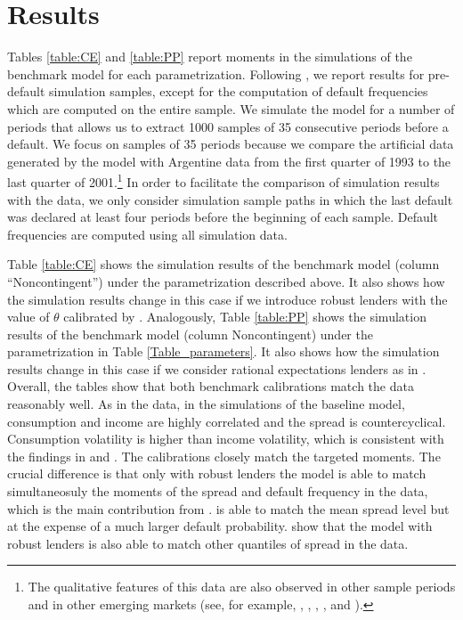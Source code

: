 \section{Results \label{sec:quantresults}}

Tables \ref{table:CE} and \ref{table:PP} report moments in the simulations of the benchmark model for each parametrization.  Following \cite{PouzoPresno2016}, we report results for pre-default simulation samples, except for the computation of default frequencies which are computed on the entire sample. We simulate the model for a number of periods that allows us to extract 1000 samples of 35 consecutive periods before a default. We focus on samples of 35 periods because we compare the artificial data generated by the model with Argentine data from the first quarter of 1993 to the last quarter of 2001.\footnote{The qualitative features of this data are also observed in other sample periods and in other emerging markets (see, for example, \citealp{AG_cycles}, \citealp{Alvarez}, \citealp{Bora}, \citealp{Neumeyer05}, and \citealp{drives}).} In order to facilitate the comparison of simulation results with the data, we only consider simulation sample paths in which the last default was declared at least four periods before the beginning
of each sample. Default frequencies are computed using all simulation data.

Table \ref{table:CE} shows the simulation results of the benchmark model (column ``Noncontingent'') under the \cite{Chatty} parametrization described above. It also shows how the simulation results change in this case if we introduce robust lenders with the value of $\theta$ calibrated by \cite{PouzoPresno2016}. Analogously, Table \ref{table:PP} shows the simulation results of the benchmark model (column Noncontingent) under the \cite{PouzoPresno2016} parametrization in Table \ref{Table_parameters}. It also shows how the simulation results change in this case if we consider rational expectations lenders as in \cite{Chatty}. Overall, the tables show that both benchmark calibrations match the data reasonably well. As in the data, in the simulations of the baseline model, consumption and income are highly correlated and the spread is countercyclical. Consumption volatility is higher than income volatility, which is consistent with the findings in \cite{Neumeyer05} and \cite{AG_cycles}. The calibrations closely match the targeted moments. The crucial difference is that only with robust lenders the model is able to match simultaneosuly the moments of the spread and default frequency in the data, which is the main contribution from \cite{PouzoPresno2016}. \cite{Chatty} is able to match the mean spread level but at the expense of a much larger default probability. \cite{PouzoPresno2016} show that the model with robust lenders is also able to match other quantiles of spread in the data.


